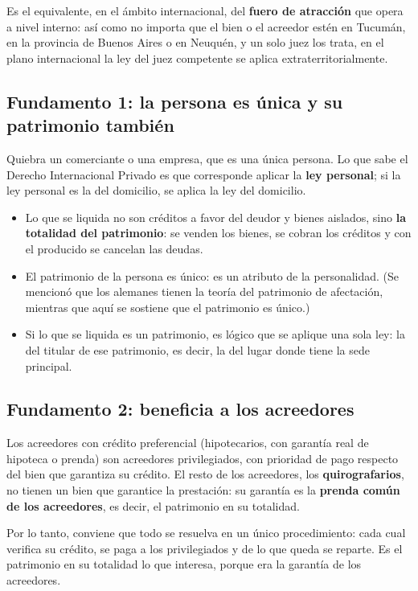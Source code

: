\documentclass[12pt,oneside]{book}
\begin{document}
Es el equivalente, en el ámbito internacional, del \textbf{fuero de atracción} que opera a nivel interno: así como no importa que el bien o el acreedor estén en Tucumán, en la provincia de Buenos Aires o en Neuquén, y un solo juez los trata, en el plano internacional la ley del juez competente se aplica extraterritorialmente.

\subsection{Fundamento 1: la persona es única y su patrimonio también}

Quiebra un comerciante o una empresa, que es una única persona. Lo que sabe el Derecho Internacional Privado es que corresponde aplicar la \textbf{ley personal}; si la ley personal es la del domicilio, se aplica la ley del domicilio.

\begin{itemize}
    \item Lo que se liquida no son créditos a favor del deudor y bienes aislados, sino \textbf{la totalidad del patrimonio}: se venden los bienes, se cobran los créditos y con el producido se cancelan las deudas.
    \item El patrimonio de la persona es único: es un atributo de la personalidad. (Se mencionó que los alemanes tienen la teoría del patrimonio de afectación, mientras que aquí se sostiene que el patrimonio es único.)
    \item Si lo que se liquida es un patrimonio, es lógico que se aplique una sola ley: la del titular de ese patrimonio, es decir, la del lugar donde tiene la sede principal.
\end{itemize}

\subsection{Fundamento 2: beneficia a los acreedores}

Los acreedores con crédito preferencial (hipotecarios, con garantía real de hipoteca o prenda) son acreedores privilegiados, con prioridad de pago respecto del bien que garantiza su crédito. El resto de los acreedores, los \textbf{quirografarios}, no tienen un bien que garantice la prestación: su garantía es la \textbf{prenda común de los acreedores}, es decir, el patrimonio en su totalidad.

Por lo tanto, conviene que todo se resuelva en un único procedimiento: cada cual verifica su crédito, se paga a los privilegiados y de lo que queda se reparte. Es el patrimonio en su totalidad lo que interesa, porque era la garantía de los acreedores.
\end{document}
